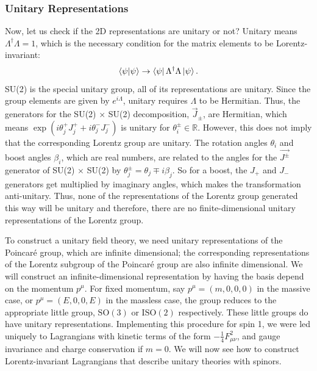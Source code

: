 \documentclass[11pt]{article}
\theoremstyle{definition}
\begin{document}
\subsubsection{Unitary Representations}
Now, let us check if the 2D representations are unitary or not? Unitary means $\Lambda^\dagger\Lambda=1$, which is the necessary condition for the matrix elements to be Lorentz-invariant:
\begin{equation}
    \braket{\psi}{\psi} \rightarrow \bra{\psi}\Lambda^\dagger \Lambda\ket{\psi}.
\end{equation}
SU(2) is the special unitary group, all of its representations are unitary. Since the group elements are given by $e^{i\Lambda}$, unitary requires $\Lambda$ to be Hermitian. Thus, the generators for the SU(2) $\times$ SU(2) decomposition, $\vec{J}_\pm$, are Hermitian, which means $\exp(i\theta_j^+J^+_j + i\theta_j^-J^-_j)$ is unitary for $\theta^\pm_i \in \mathbb{R}$. However, this does not imply that the corresponding Lorentz group are unitary. The rotation angles $\theta_i$ and boost angles $\beta_i$, which are real numbers, are related to the angles for the $\vec{J^\pm}$ generator of SU(2) $\times$ SU(2) by $\theta^\pm_j = \theta_j  \mp i\beta_j$. So for a boost, the \(J_+\) and \(J_-\) generators get multiplied by imaginary angles, which makes the transformation anti-unitary. Thus, none of the representations of the Lorentz group generated this way will be unitary and therefore, there are no finite-dimensional unitary representations of the Lorentz group.

To construct a unitary field theory, we need unitary representations of the Poincaré group, which are infinite dimensional; the corresponding representations of the Lorentz subgroup of the Poincaré group are also infinite dimensional. We will construct an infinite-dimensional representation by having the basis depend on the momentum \(p^\mu\). For fixed momentum, say \( p^\mu = (m, 0, 0, 0) \) in the massive case, or \( p^\mu = (E, 0, 0, E) \) in the massless case, the group reduces to the appropriate little group, \(\mathrm{SO}(3)\) or \(\mathrm{ISO}(2)\) respectively. These little groups do have unitary representations. Implementing this procedure for spin 1, we were led uniquely to Lagrangians with kinetic terms of the form \( -\frac{1}{4} F_{\mu\nu}^2 \), and gauge invariance and charge conservation if \( m = 0 \). We will now see how to construct Lorentz-invariant Lagrangians that describe unitary theories with spinors.
\end{document}
